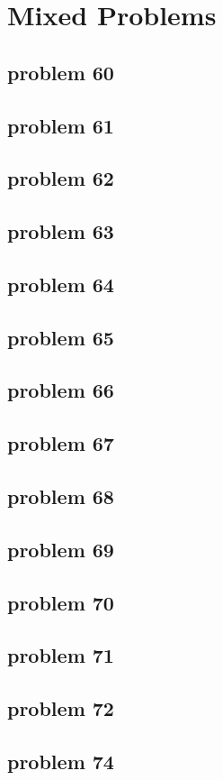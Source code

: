\section{Mixed Problems}

\subsection{problem 60}


\subsection{problem 61}


\subsection{problem 62}


\subsection{problem 63}


\subsection{problem 64}


\subsection{problem 65}


\subsection{problem 66}


\subsection{problem 67}


\subsection{problem 68}


\subsection{problem 69}


\subsection{problem 70}


\subsection{problem 71}


\subsection{problem 72}


\subsection{problem 74}

